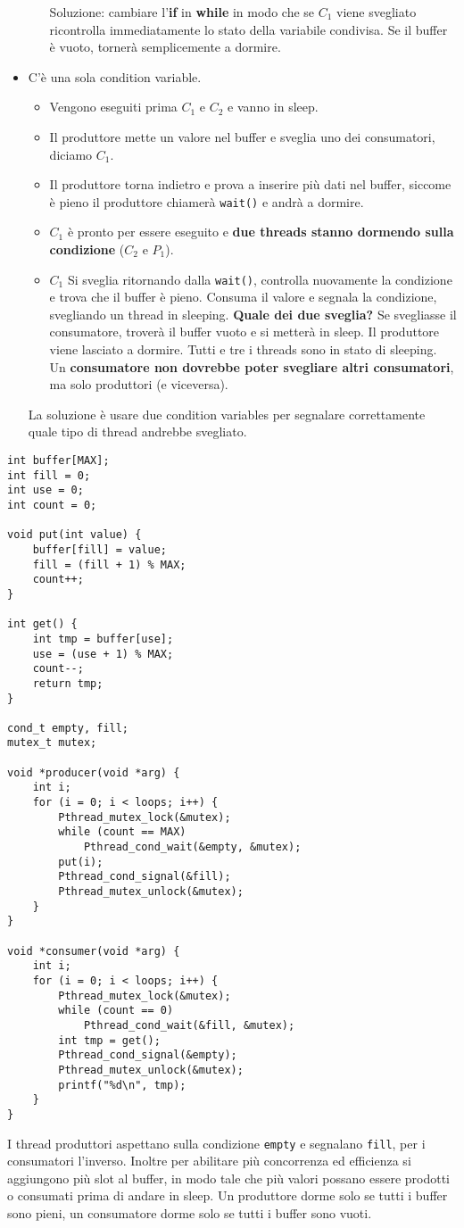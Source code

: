 \documentclass[12pt, letterpaper]{article}
\begin{document}
\begin{itemize}
\begin{itemize}
						Soluzione: cambiare l'\textbf{if} in \textbf{while} in modo che se $C_1$ viene svegliato ricontrolla immediatamente lo stato della variabile condivisa. Se il buffer è vuoto, tornerà semplicemente a dormire.
					\end{itemize}
					\item C'è una sola condition variable.
					\begin{itemize}
						\item Vengono eseguiti prima $C_1$ e $C_2$ e vanno in sleep.
						\item Il produttore mette un valore nel buffer e sveglia uno dei consumatori, diciamo $C_1$.
						\item Il produttore torna indietro e prova a inserire più dati nel buffer, siccome è pieno il produttore chiamerà \texttt{wait()} e andrà a dormire.
						\item $C_1$ è pronto per essere eseguito e \textbf{due threads stanno dormendo sulla condizione} ($C_2$ e $P_1$).
						\item $C_1$ Si sveglia ritornando dalla \texttt{wait()}, controlla nuovamente la condizione e trova che il buffer è pieno. Consuma il valore e segnala la condizione, svegliando un thread in sleeping. \textbf{Quale dei due sveglia?} Se svegliasse il consumatore, troverà il buffer vuoto e si metterà in sleep. Il produttore viene lasciato a dormire. Tutti e tre i threads sono in stato di sleeping. Un \textbf{consumatore non dovrebbe poter svegliare altri consumatori}, ma solo produttori (e viceversa).
					\end{itemize}
					La soluzione è usare due condition variables per segnalare correttamente quale tipo di thread andrebbe svegliato.
				\end{itemize}
				\begin{lstlisting}[style=CStyle]
int buffer[MAX];
int fill = 0;
int use = 0;
int count = 0;

void put(int value) {
	buffer[fill] = value;
	fill = (fill + 1) % MAX;
	count++;
}

int get() {
	int tmp = buffer[use];
	use = (use + 1) % MAX;
	count--;
	return tmp;
}

cond_t empty, fill;
mutex_t mutex;

void *producer(void *arg) {
	int i;
	for (i = 0; i < loops; i++) {
		Pthread_mutex_lock(&mutex);	
		while (count == MAX)
			Pthread_cond_wait(&empty, &mutex); 
		put(i);
		Pthread_cond_signal(&fill);
		Pthread_mutex_unlock(&mutex);
	}
}

void *consumer(void *arg) {
	int i;
	for (i = 0; i < loops; i++) {
		Pthread_mutex_lock(&mutex);
		while (count == 0)
			Pthread_cond_wait(&fill, &mutex);
		int tmp = get();
		Pthread_cond_signal(&empty);
		Pthread_mutex_unlock(&mutex);
		printf("%d\n", tmp);
	}
}				\end{lstlisting}
				I thread produttori aspettano sulla condizione \texttt{empty} e segnalano \texttt{fill}, per i consumatori l'inverso. Inoltre per abilitare più concorrenza ed efficienza si aggiungono più slot al buffer, in modo tale che più valori possano essere prodotti o consumati prima di andare in sleep. Un produttore dorme solo se tutti i buffer sono pieni, un consumatore dorme solo se tutti i buffer sono vuoti.
\end{document}
